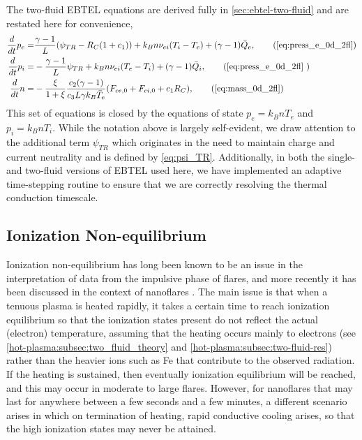 The two-fluid EBTEL equations are derived fully in \autoref{sec:ebtel-two-fluid} and are restated here for convenience,
\begin{align}
    \frac{d}{dt}p_e =& \frac{\gamma - 1}{L}(\psi_{TR} - R_C(1 + c_1)) + k_Bn\nu_{ei}(T_i - T_e) + (\gamma - 1)\bar{Q}_e,\tag{\ref{eq:press_e_0d_2fl}} \\
    \frac{d}{dt}p_i =& -\frac{\gamma - 1}{L}\psi_{TR} + k_Bn\nu_{ei}(T_e - T_i) + (\gamma - 1)\bar{Q}_i,\tag{\ref{eq:press_e_0d_2fl} }\\
    \frac{d}{dt}n =& -\frac{\xi}{1+\xi}\frac{c_2(\gamma - 1)}{c_3L\gamma k_B\bar{T}_e}(F_{ce,0} + F_{ci,0} + c_1R_C),\tag{\ref{eq:mass_0d_2fl}}
\end{align}
This set of equations is closed by the equations of state $p_e=k_BnT_e$ and $p_i=k_BnT_i$. While the notation above is largely self-evident, we draw attention to the additional term $\psi_{TR}$ which originates in the need to maintain charge and current neutrality and is defined by \autoref{eq:psi_TR}. Additionally, in both the single- and two-fluid versions of EBTEL used here, we have implemented an adaptive time-stepping routine to ensure that we are correctly resolving the thermal conduction timescale.

\subsection{Ionization Non-equilibrium}\label{hot-plasma:subsec:nei_theory}

Ionization non-equilibrium has long been known to be an issue in the interpretation of data from the impulsive phase of flares, and more recently it has been discussed in the context of nanoflares \citep{bradshaw_explosive_2006,reale_nonequilibrium_2008}. The main issue is that when a tenuous plasma is heated rapidly, it takes a certain time to reach ionization equilibrium so that the ionization states present do not reflect the actual (electron) temperature, assuming that the heating occurs mainly to electrons (see \autoref{hot-plasma:subsec:two_fluid_theory} and \autoref{hot-plasma:subsec:two-fluid-res}) rather than the heavier ions such as Fe that contribute to the observed radiation. If the heating is sustained, then eventually ionization equilibrium will be reached, and this may occur in moderate to large flares. However, for nanoflares that may last for anywhere between a few seconds and a few minutes, a different scenario arises in which on termination of heating, rapid conductive cooling arises, so that the high ionization states may never be attained.

